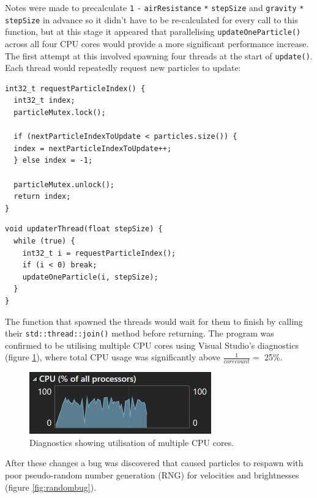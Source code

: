 \documentclass[11pt, a4paper, twocolumn]{article}
\begin{document}
Notes were made to precalculate \verb|1| \verb|-| \verb|airResistance| \verb|*| \verb|stepSize| and \verb|gravity| \verb|*| \verb|stepSize| in advance so it didn't have to be re-calculated for every call to this function, but at this stage it appeared that parallelising \verb|updateOneParticle()| across all four CPU cores would provide a more significant performance increase. The first attempt at this involved spawning four threads at the start of \verb|update()|. Each thread would repeatedly request new particles to update:

\begin{verbatim}
int32_t requestParticleIndex() {
  int32_t index;
  particleMutex.lock();
  
  if (nextParticleIndexToUpdate < particles.size()) {
  index = nextParticleIndexToUpdate++;
  } else index = -1;
  
  particleMutex.unlock();
  return index;
}
\end{verbatim}
\begin{verbatim}
void updaterThread(float stepSize) {
  while (true) {
    int32_t i = requestParticleIndex();
    if (i < 0) break;
    updateOneParticle(i, stepSize);
  }
}
\end{verbatim}

The function that spawned the threads would wait for them to finish by calling their \verb|std::thread::join()| method before returning. The program was confirmed to be utilising multiple CPU cores using Visual Studio's diagnostics (figure \ref{fig:multithread-diagnostics}), where total CPU usage was significantly above $\frac{1}{core count}=$ 25\%.

\begin{figure}[h]
\includegraphics[width=\linewidth]{multithread-diagnostics}
\caption{Diagnostics showing utilisation of multiple CPU cores.}
\label{fig:multithread-diagnostics}
\end{figure}

After these changes a bug was discovered that caused particles to respawn with poor pseudo-random number generation (RNG) for velocities and brightnesses (figure \ref{fig:randombug}).
\end{document}
